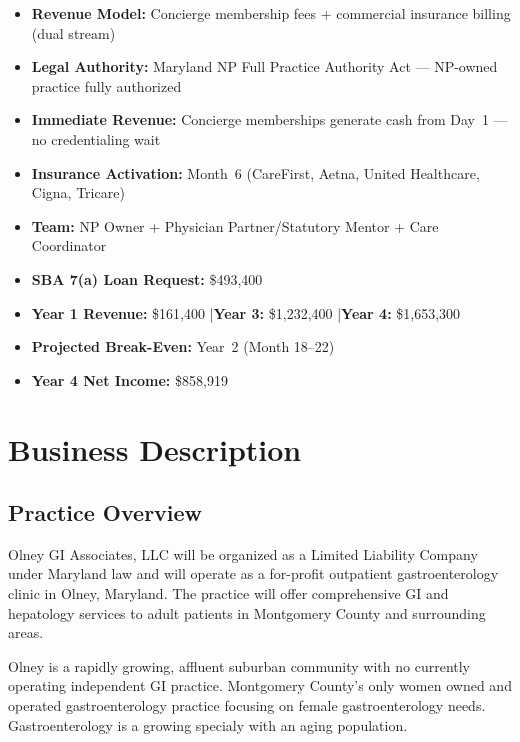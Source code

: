 \documentclass[11pt,letterpaper]{article}
\begin{document}
\begin{highlightbox}
\begin{itemize}
  \item \textbf{Revenue Model:} Concierge membership fees + commercial insurance billing (dual stream)
  \item \textbf{Legal Authority:} Maryland NP Full Practice Authority Act --- NP-owned practice fully authorized
  \item \textbf{Immediate Revenue:} Concierge memberships generate cash from Day~1 --- no credentialing wait
  \item \textbf{Insurance Activation:} Month~6 (CareFirst, Aetna, United Healthcare, Cigna, Tricare)
  \item \textbf{Team:} NP Owner + Physician Partner/Statutory Mentor + Care Coordinator
  \item \textbf{SBA 7(a) Loan Request:} \$493,400
  \item \textbf{Year 1 Revenue:} \$161,400 \quad|\quad \textbf{Year 3:} \$1,232,400 \quad|\quad \textbf{Year 4:} \$1,653,300
  \item \textbf{Projected Break-Even:} Year~2 (Month 18--22)
  \item \textbf{Year 4 Net Income:} \$858,919
\end{itemize}
\end{highlightbox}

\newpage

\section{Business Description}

\subsection{Practice Overview}

Olney GI Associates, LLC will be organized as a Limited Liability Company under Maryland law and will operate as a for-profit outpatient gastroenterology clinic in Olney, Maryland. The practice will offer comprehensive GI and hepatology services to adult patients in Montgomery County and surrounding areas.

Olney is a rapidly growing, affluent suburban community with no currently operating independent GI practice.  Montgomery County's only women owned and operated gastroenterology practice focusing on female gastroenterology needs. Gastroenterology is a growing specialy with an aging population.
\end{document}
